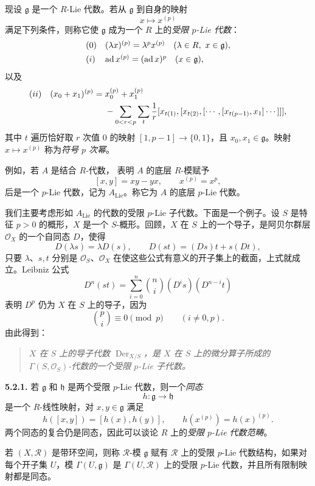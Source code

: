 现设 \(\mathfrak g\) 是一个 \(R\)-Lie 代数。若从 \(\mathfrak g\) 到自身的映射
\[
  x\longmapsto x^{(p)}
\]
满足下列条件，则称它使 \(\mathfrak g\) 成为一个 \(R\) 上的\emph{受限 \(p\)-Lie 代数}：
\[
\begin{array}{ll}
  \SGAInlineEquationTarget{sga3:VIIA:5.2:condition:0}(0) &
  (\lambda x)^{(p)}
  =
  \lambda^p x^{(p)}
  \quad
  (\lambda\in R,\ x\in\mathfrak g), \\[0.4em]
  \SGAInlineEquationTarget{sga3:VIIA:5.2:condition:i}(i) &
  \operatorname{ad}x^{(p)}
  =
  (\operatorname{ad}x)^p
  \quad
  (x\in\mathfrak g),
\end{array}
\]
以及
\[
\begin{aligned}
  \SGAInlineEquationTarget{sga3:VIIA:5.2:condition:ii}(ii)\quad
  (x_0+x_1)^{(p)}
  ={}&
  x_0^{(p)}+x_1^{(p)} \\
  &-
  \sum_{0<r<p}\sum_t\frac1r
  [x_{t(1)},
    [x_{t(2)},
      [\cdots,
        [x_{t(p-1)},x_1]
      \cdots]
    ]
  ],
\end{aligned}
\]
其中 \(t\) 遍历恰好取 \(r\) 次值 \(0\) 的映射 \([1,p-1]\to\{0,1\}\)，且 \(x_0,x_1\in\mathfrak g\)。映射 \(x\mapsto x^{(p)}\) 称为\emph{符号 \(p\) 次幂}。

例如，若 \(A\) 是结合 \(R\)-代数， 表明 \(A\) 的底层 \(R\)-模赋予
\[
  [x,y]=xy-yx,
  \qquad
  x^{(p)}=x^p,
\]
后是一个 \(p\)-Lie 代数，记为 \(A_{\mathrm{Lie}}\)。称它为 \(A\) 的底层 \(p\)-Lie 代数。

我们主要考虑形如 \(A_{\mathrm{Lie}}\) 的代数的受限 \(p\)-Lie 子代数。下面是一个例子。设 \(S\) 是特征 \(p>0\) 的概形，\(X\) 是一个 \(S\)-概形。回顾，\(X\) 在 \(S\) 上的一个导子，是阿贝尔群层 \(\mathcal O_X\) 的一个自同态 \(D\)，使得
\[
  D(\lambda s)=\lambda D(s),
  \qquad
  D(st)=(Ds)t+s(Dt),
\]
只要 \(\lambda\)、\(s,t\) 分别是 \(\mathcal O_S\)、\(\mathcal O_X\) 在使这些公式有意义的开子集上的截面，上式就成立。Leibniz 公式
\[
  D^n(st)
  =
  \sum_{i=0}^n
  \binom ni
  (D^is)(D^{n-i}t)
\]
表明 \(D^p\) 仍为 \(X\) 在 \(S\) 上的导子，因为
\[
  \binom pi\equiv0\pmod p
  \qquad(i\ne0,p).
\]
由此得到：

\begin{quote}
\textit{\(X\) 在 \(S\) 上的导子代数 \(\operatorname{Der}_{X/S}\)，是 \(X\) 在 \(S\) 上的微分算子所成的 \(\Gamma(S,\mathcal O_S)\)-代数的一个受限 \(p\)-Lie 子代数。}
\end{quote}

\medskip
\noindent\textbf{5.2.1.}
\label{sga3:VIIA:5.2.1}
若 \(\mathfrak g\) 和 \(\mathfrak h\) 是两个受限 \(p\)-Lie 代数，则一个\emph{同态}
\[
  h:\mathfrak g\longrightarrow\mathfrak h
\]
是一个 \(R\)-线性映射，对 \(x,y\in\mathfrak g\) 满足
\[
  h([x,y])=[h(x),h(y)],
  \qquad
  h(x^{(p)})=h(x)^{(p)}.
\]
两个同态的复合仍是同态，因此可以谈论 \(R\) 上的\emph{受限 \(p\)-Lie 代数范畴}。

若 \((X,\mathcal R)\) 是带环空间，则称 \(\mathcal R\)-模 \(\mathfrak g\) 赋有 \(\mathcal R\) 上的受限 \(p\)-Lie 代数结构，如果对每个开子集 \(U\)，模 \(\Gamma(U,\mathfrak g)\) 是 \(\Gamma(U,\mathcal R)\) 上的受限 \(p\)-Lie 代数，并且所有限制映射都是同态。

